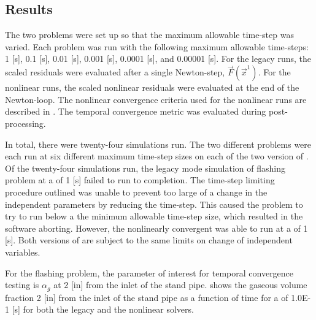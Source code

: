 \subsection{Results}
\label{subsect:results}

The two problems were set up so that the maximum allowable time-step was varied.
Each problem was run with the following maximum allowable time-steps: 1 [s], 0.1 [s], 0.01 [s], 0.001 [s], 0.0001 [s], and 0.00001 [s]. 
For the legacy runs, the scaled residuals were evaluated after a single Newton-step, $\vec{F}(\vec{x}^{1})$.
For the nonlinear runs, the scaled nonlinear residuals were evaluated at the end of the Newton-loop.
The nonlinear convergence criteria used for the nonlinear runs are described in .
The temporal convergence metric was evaluated during post-processing.

In total, there were twenty-four simulations run.
The two different problems were each run at six different maximum time-step sizes on each of the two version of \cobra.
Of the twenty-four simulations run, the legacy mode simulation of flashing problem at a \dtmax{} of 1 [s] failed to run to completion.
The time-step limiting procedure outlined  was unable to prevent too large of a change in the independent parameters by reducing the time-step.
This caused the problem to try to run below a the minimum allowable time-step size, which resulted in the software aborting.
However, the nonlinearly convergent \cobra{} was able to run at a \dtmax{} of 1 [s].
Both versions of \cobra{} are subject to the same limits on change of independent variables.

For the flashing problem, the parameter of interest for temporal convergence testing is $\alpha_g$ at 2 [in] from the inlet of the stand pipe.
 shows the gaseous volume fraction 2 [in] from the inlet of the stand pipe as a function of time for a \dtmax{} of 1.0E-1 [s] for both the legacy and the nonlinear solvers.


